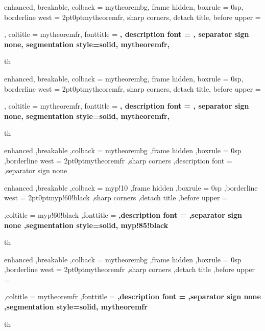 {%
	enhanced,
	breakable,
	colback = mytheorembg,
	frame hidden,
	boxrule = 0sp,
	borderline west = {2pt}{0pt}{mytheoremfr},
	sharp corners,
	detach title,
	before upper = \tcbtitle\par\smallskip,
	coltitle = mytheoremfr,
	fonttitle = \bfseries\sffamily,
	description font = \mdseries,
	separator sign none,
	segmentation style={solid, mytheoremfr},
}
{th}

{%
	enhanced,
	breakable,
	colback = mytheorembg,
	frame hidden,
	boxrule = 0sp,
	borderline west = {2pt}{0pt}{mytheoremfr},
	sharp corners,
	detach title,
	before upper = \tcbtitle\par\smallskip,
	coltitle = mytheoremfr,
	fonttitle = \bfseries\sffamily,
	description font = \mdseries,
	separator sign none,
	segmentation style={solid, mytheoremfr},
}
{th}


{%
	enhanced
	,breakable
	,colback = mytheorembg
	,frame hidden
	,boxrule = 0sp
	,borderline west = {2pt}{0pt}{mytheoremfr}
	,sharp corners
	,description font = \mdseries
	,separator sign none
}


{%
	enhanced
	,breakable
	,colback = myp!10
	,frame hidden
	,boxrule = 0sp
	,borderline west = {2pt}{0pt}{myp!60!black}
	,sharp corners
	,detach title
	,before upper = \tcbtitle\par\smallskip
	,coltitle = myp!60!black
	,fonttitle = \bfseries\sffamily
	,description font = \mdseries
	,separator sign none
	,segmentation style={solid, myp!85!black}
}
{th}
{%
	enhanced
	,breakable
	,colback = mytheorembg
	,frame hidden
	,boxrule = 0sp
	,borderline west = {2pt}{0pt}{mytheoremfr}
	,sharp corners
	,detach title
	,before upper = \tcbtitle\par\smallskip
	,coltitle = mytheoremfr
	,fonttitle = \bfseries\sffamily
	,description font = \mdseries
	,separator sign none
	,segmentation style={solid, mytheoremfr}
}
{th}

